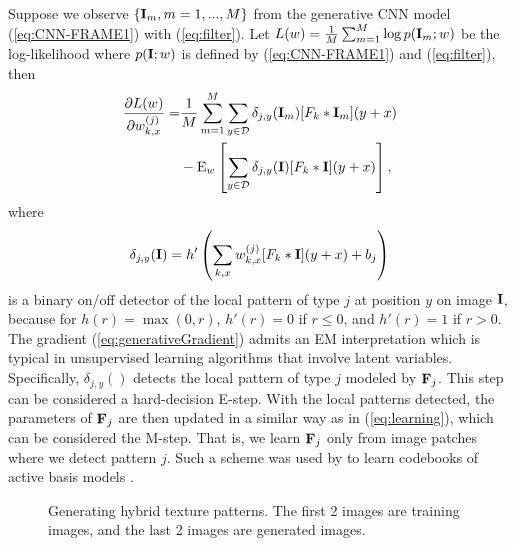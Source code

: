 \documentclass[letterpaper]{article}
\def\E{{\rm E}}
\def\I{{\bf I}}
\def\F{{\bf F}}
\begin{document}
Suppose we observe $\{\I_m, m = 1, ..., M\}$ from  the generative CNN model (\ref{eq:CNN-FRAME1}) with (\ref{eq:filter}). Let $L(w) = \frac{1}{M} \sum_{m=1}^{M} \log p(\I_m; w)$ be the log-likelihood where $p(\I; w)$ is defined by (\ref{eq:CNN-FRAME1}) and (\ref{eq:filter}), then 
\begin{equation}
\begin{aligned}
\frac{\partial L(w)}{\partial w_{k, x}^{(j)}} =& \frac{1}{M} \sum_{m=1}^{M}\sum_{y \in {\cal D}} \delta_{j, y}(\I_m)  [F_{k} * \I_m](y+x) \\
      &   -  \E_{w} \left[ \sum_{y \in {\cal D}} \delta_{j, y}(\I)  [F_{k} * \I](y+x)\right], 
\end{aligned}
\label{eq:generativeGradient}
\end{equation}
where 
\begin{eqnarray}
\delta_{j, y}(\I) = h'\left( \sum_{k,  x} w^{(j)}_{k,   x}  [F_{k} * \I](y+x) +b_j\right)
\label{eq:detector}
\end{eqnarray}
is a binary on/off detector of the local pattern of type $j$ at position $y$ on image $\I$,  because for $h(r) = \max(0, r)$, $h'(r) = 0$ if $r  \leq  0$, and $h'(r) = 1$ if $r > 0$.  The gradient (\ref{eq:generativeGradient}) admits an EM \citep{dempster1977maximum} interpretation which is typical in unsupervised learning algorithms that involve latent  variables. Specifically, $\delta_{j, y}()$ detects the local pattern of type $j$  modeled by $\F_j$. This step can be considered a hard-decision E-step. With the local patterns detected,  the parameters of $\F_j$ are then updated in a similar way as in (\ref{eq:learning}),  which can be considered the M-step. That is, we learn $\F_j$ only from image patches where we detect pattern  $j$. Such a scheme was used by \cite{Hongyi2014} to learn codebooks of active basis models \citep{AB}. 


\begin{figure}
	\centering
	\setlength{\fboxrule}{1pt}
	\setlength{\fboxsep}{0cm}
			\caption{Generating hybrid texture patterns. 
		The first 2 images are training images, and the last 2 images are generated images. }
	\label{fig:hybrid2}
\end{figure}
\end{document}
